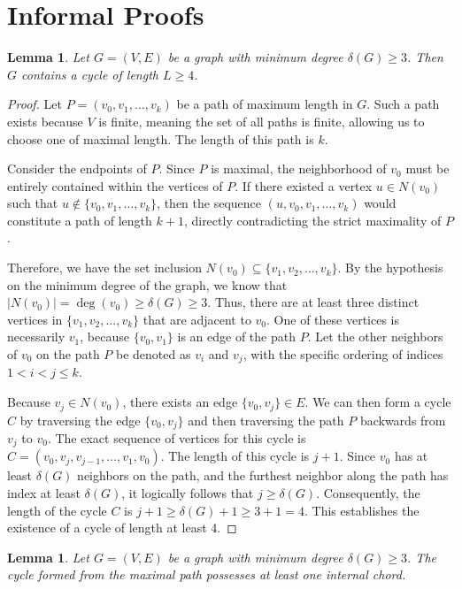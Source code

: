 \documentclass[11pt,a4paper]{article}
\newtheorem{lemma}[theorem]{Lemma}
\begin{document}
\section{Informal Proofs}

\begin{lemma}
Let $G = (V, E)$ be a graph with minimum degree $\delta(G) \ge 3$. Then $G$ contains a cycle of length $L \ge 4$.
\end{lemma}

\begin{proof}
Let $P = (v_0, v_1, \dots, v_k)$ be a path of maximum length in $G$. Such a path exists because $V$ is finite, meaning the set of all paths is finite, allowing us to choose one of maximal length. The length of this path is $k$.

Consider the endpoints of $P$. Since $P$ is maximal, the neighborhood of $v_0$ must be entirely contained within the vertices of $P$. If there existed a vertex $u \in N(v_0)$ such that $u \notin \{v_0, v_1, \dots, v_k\}$, then the sequence $(u, v_0, v_1, \dots, v_k)$ would constitute a path of length $k+1$, directly contradicting the strict maximality of $P$.

Therefore, we have the set inclusion $N(v_0) \subseteq \{v_1, v_2, \dots, v_k\}$.
By the hypothesis on the minimum degree of the graph, we know that $|N(v_0)| = \deg(v_0) \ge \delta(G) \ge 3$.
Thus, there are at least three distinct vertices in $\{v_1, v_2, \dots, v_k\}$ that are adjacent to $v_0$.
One of these vertices is necessarily $v_1$, because $\{v_0, v_1\}$ is an edge of the path $P$.
Let the other neighbors of $v_0$ on the path $P$ be denoted as $v_i$ and $v_j$, with the specific ordering of indices $1 < i < j \le k$.

Because $v_j \in N(v_0)$, there exists an edge $\{v_0, v_j\} \in E$.
We can then form a cycle $C$ by traversing the edge $\{v_0, v_j\}$ and then traversing the path $P$ backwards from $v_j$ to $v_0$.
The exact sequence of vertices for this cycle is $C = (v_0, v_j, v_{j-1}, \dots, v_1, v_0)$.
The length of this cycle is $j + 1$.
Since $v_0$ has at least $\delta(G)$ neighbors on the path, and the furthest neighbor along the path has index at least $\delta(G)$, it logically follows that $j \ge \delta(G)$.
Consequently, the length of the cycle $C$ is $j + 1 \ge \delta(G) + 1 \ge 3 + 1 = 4$.
This establishes the existence of a cycle of length at least 4.
\end{proof}

\begin{lemma}
Let $G = (V, E)$ be a graph with minimum degree $\delta(G) \ge 3$. The cycle formed from the maximal path possesses at least one internal chord.
\end{lemma}
\end{document}
